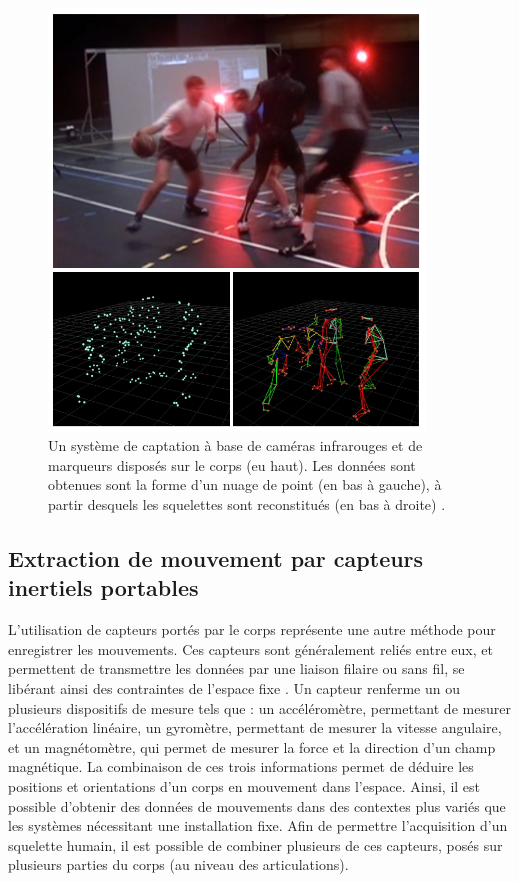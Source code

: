 \begin{figure}[h]
    \centering
    \includegraphics[width=10cm]{pictures/infrared_camera_Morel.png}
    \caption[Système de captation par caméra infrarouge \parencite{Morel2017Mts}]{Un système de captation à base de caméras infrarouges et de marqueurs disposés sur le corps (eu haut). Les données sont obtenues sont la forme d'un nuage de point (en bas à gauche), à partir desquels les squelettes sont reconstitués (en bas à droite) \parencite{Morel2017Mts}.}
    \label{fig:infrared_camera_Morel}
\end{figure}

\subsection{Extraction de mouvement par capteurs inertiels portables}
L'utilisation de capteurs portés par le corps représente une autre méthode pour enregistrer les mouvements. Ces capteurs sont généralement reliés entre eux, et permettent de transmettre les données par une liaison filaire ou sans fil, se libérant ainsi des contraintes de l'espace fixe \parencite{PORCIUNCULA2018S220}. Un capteur renferme un ou plusieurs dispositifs de mesure tels que : un accéléromètre, permettant de mesurer l'accélération linéaire, un gyromètre, permettant de mesurer la vitesse angulaire, et un magnétomètre, qui permet de mesurer la force et la direction d'un champ magnétique. La combinaison de ces trois informations permet de déduire les positions et orientations d'un corps en mouvement dans l'espace. Ainsi, il est possible d'obtenir des données de mouvements dans des contextes plus variés que les systèmes nécessitant une installation fixe. Afin de permettre l'acquisition d'un squelette humain, il est possible de combiner plusieurs de ces capteurs, posés sur plusieurs parties du corps (au niveau des articulations).

